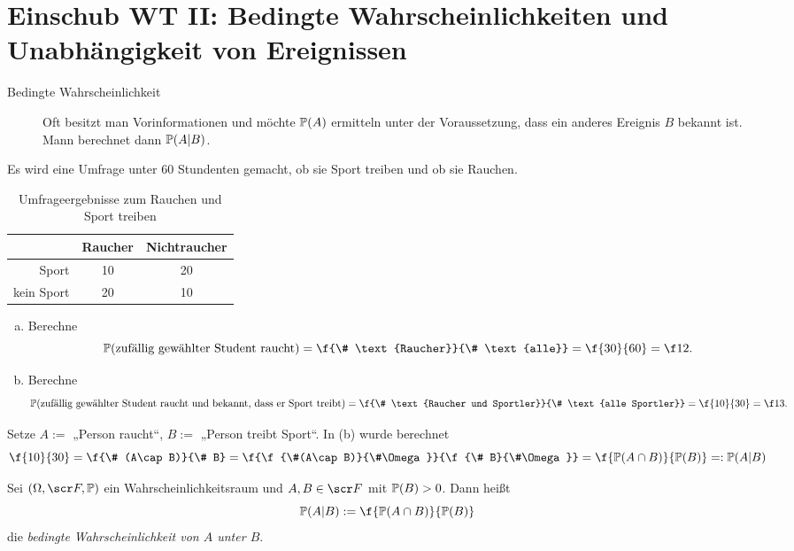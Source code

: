 \section{Einschub WT II: Bedingte Wahrscheinlichkeiten und Unabhängigkeit von Ereignissen}


\begin{description}
	\item[Bedingte Wahrscheinlichkeit]
		Oft besitzt man Vorinformationen und möchte $\P(A)$ ermitteln unter der Voraussetzung, dass ein anderes Ereignis $B$ bekannt ist.
		Mann berechnet dann $\P(A|B)$.
\end{description}

\begin{ex} \label{1.5.1}
	Es wird eine Umfrage unter 60 Stundenten gemacht, ob sie Sport treiben und ob sie Rauchen.
	\begin{table}[H]
		\centering
		\caption{Umfrageergebnisse zum Rauchen und Sport treiben}
		\begin{tabular}{r|cc}
			& Raucher & Nichtraucher \\\hline
			Sport & 10 & 20 \\
			kein Sport & 20 & 10
		\end{tabular}
	\end{table}
	\begin{enumerate}[(a)]
		\item
			Berechne
			\[
				\P(\text{zufällig gewählter Student raucht})
				= \f {\# \text{Raucher}}{\# \text{alle}}
				= \f {30}{60}
				= \f 12.
			\]
		\item
			Berechne
			\[
				\P(\text{zufällig gewählter Student raucht und bekannt, dass er Sport treibt})
				= \f {\# \text{Raucher und Sportler}}{\# \text{alle Sportler}}
				= \f {10}{30}
				= \f 13.
			\]
	\end{enumerate}
	Setze $A := $ „Person raucht“, $B := $ „Person treibt Sport“.
	In (b) wurde berechnet
	\[
		\f {10}{30}
		= \f {\# (A\cap B)}{\# B}
		= \f {\f{\#(A\cap B)}{\#\Omega}}{\f {\# B}{\#\Omega}}
		= \f {\P(A \cap B)}{\P(B)}
		=: \P(A|B)
	\]
\end{ex}

\begin{df} \label{1.5.2}
	Sei $(\Omega, \scr F, \P)$ ein Wahrscheinlichkeitsraum und $A,B \in \scr F$ mit $\P(B) > 0$.
	Dann heißt
	\[
		\P(A | B) := \f {\P(A\cap B)}{\P(B)}
	\]
	die \emph{bedingte Wahrscheinlichkeit von $A$ unter $B$}.
\end{df}

